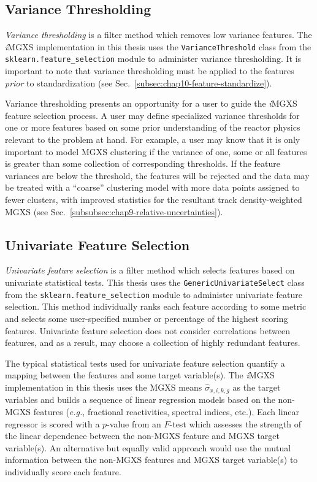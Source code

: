 \subsection{Variance Thresholding}
\label{subsec:chap10-var-threshold}

\textit{Variance thresholding} is a filter method which removes low variance features. The \textit{i}\ac{MGXS} implementation in this thesis uses the \texttt{VarianceThreshold} class from the \texttt{sklearn.feature_selection} module to administer variance thresholding. It is important to note that variance thresholding must be applied to the features \textit{prior} to standardization (see Sec.~\ref{subsec:chap10-feature-standardize}).

Variance thresholding presents an opportunity for a user to guide the \textit{i}\ac{MGXS} feature selection process. A user may define specialized variance thresholds for one or more features based on some prior understanding of the reactor physics relevant to the problem at hand. For example, a user may know that it is only important to model \ac{MGXS} clustering if the variance of one, some or all features is greater than some collection of corresponding thresholds. If the feature variances are below the threshold, the features will be rejected and the data may be treated with a ``coarse'' clustering model with more data points assigned to fewer clusters, with improved statistics for the resultant track density-weighted \ac{MGXS} (see Sec.~\ref{subsubsec:chap9-relative-uncertainties}).

\subsection{Univariate Feature Selection}
\label{subsec:chap10-univariate-selection}

\textit{Univariate feature selection} is a filter method which selects features based on univariate statistical tests. This thesis uses the \texttt{GenericUnivariateSelect} class from the \texttt{sklearn.feature_selection} module to administer univariate feature selection. This method individually ranks each feature according to some metric and selects some user-specified number or percentage of the highest scoring features. Univariate feature selection does not consider correlations between features, and as a result, may choose a collection of highly redundant features.

The typical statistical tests used for univariate feature selection quantify a mapping between the features and some target variable(s). The \textit{i}\ac{MGXS} implementation in this thesis uses the \ac{MGXS} means $\hat{\sigma}_{x,i,k,g}$ as the target variables and builds a sequence of linear regression models based on the non-\ac{MGXS} features (\textit{e.g.}, fractional reactivities, spectral indices, etc.). Each linear regressor is scored with a $p$-value from an $F$-test which assesses the strength of the linear dependence between the non-\ac{MGXS} feature and \ac{MGXS} target variable(s). An alternative but equally valid approach would use the mutual information between the non-\ac{MGXS} features and \ac{MGXS} target variable(s) to individually score each feature. 

